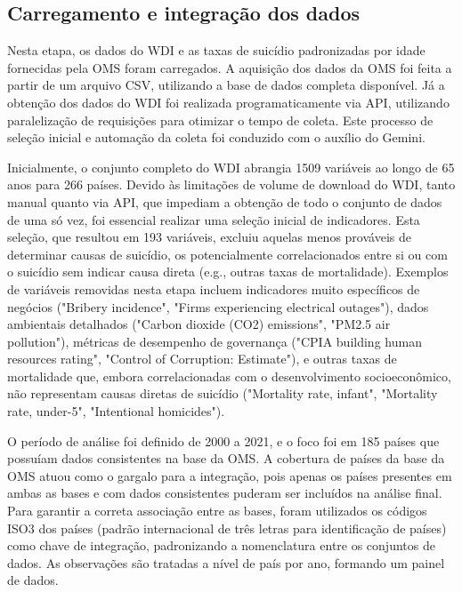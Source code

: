 \documentclass[letterpaper]{article}
\begin{document}
\subsection{Carregamento e integração dos dados} %

Nesta etapa, os dados do WDI e as taxas de suicídio padronizadas por idade fornecidas pela OMS foram carregados. A aquisição dos dados da OMS foi feita a partir de um arquivo CSV, utilizando a base de dados completa disponível. Já a obtenção dos dados do WDI foi realizada programaticamente via API, utilizando paralelização de requisições para otimizar o tempo de coleta. Este processo de seleção inicial e automação da coleta foi conduzido com o auxílio do Gemini.

Inicialmente, o conjunto completo do WDI abrangia 1509 variáveis ao longo de 65 anos para 266 países. Devido às limitações de volume de download do WDI, tanto manual quanto via API, que impediam a obtenção de todo o conjunto de dados de uma só vez, foi essencial realizar uma seleção inicial de indicadores. Esta seleção, que resultou em 193 variáveis, excluiu aquelas menos prováveis de determinar causas de suicídio, os potencialmente correlacionados entre si ou com o suicídio sem indicar causa direta (e.g., outras taxas de mortalidade). Exemplos de variáveis removidas nesta etapa incluem indicadores muito específicos de negócios ("Bribery incidence", "Firms experiencing electrical outages"), dados ambientais detalhados ("Carbon dioxide (CO2) emissions", "PM2.5 air pollution"), métricas de desempenho de governança ("CPIA building human resources rating", "Control of Corruption: Estimate"), e outras taxas de mortalidade que, embora correlacionadas com o desenvolvimento socioeconômico, não representam causas diretas de suicídio ("Mortality rate, infant", "Mortality rate, under-5", "Intentional homicides").

O período de análise foi definido de 2000 a 2021, e o foco foi em 185 países que possuíam dados consistentes na base da OMS. A cobertura de países da base da OMS atuou como o gargalo para a integração, pois apenas os países presentes em ambas as bases e com dados consistentes puderam ser incluídos na análise final. Para garantir a correta associação entre as bases, foram utilizados os códigos ISO3 dos países (padrão internacional de três letras para identificação de países) como chave de integração, padronizando a nomenclatura entre os conjuntos de dados. As observações são tratadas a nível de país por ano, formando um painel de dados.
\end{document}
